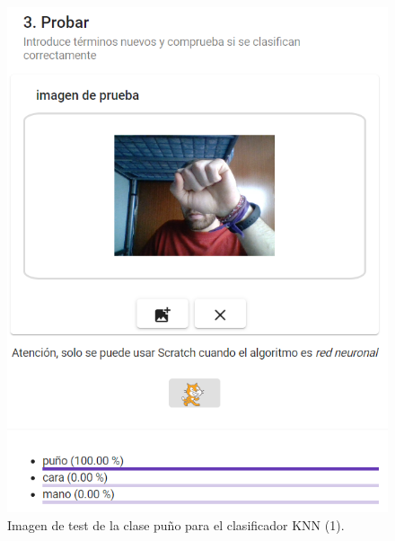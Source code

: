\documentclass[a4paper, 12pt]{book}
\begin{document}
\begin{figure}
	\centering
	\includegraphics[width=12cm, keepaspectratio]{img/testpunoknnbien}
	\caption{Imagen de test de la clase puño para el clasificador KNN (1).}			
	\label{fig:testmanoknnbien}
\end{figure}
\end{document}
